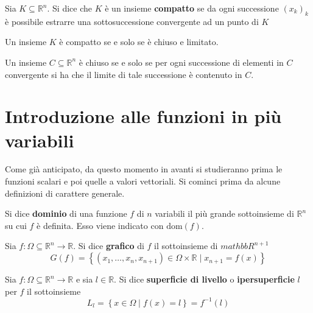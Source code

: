 \begin{definition}
    Sia $K \subseteq \mathbb{R}^n$. Si dice che $K$ è un insieme \textbf{compatto} se da ogni successione $(x_k)_k$ è possibile estrarre una sottosuccessione convergente ad un punto di $K$
\end{definition}
\begin{theorem} \label{Teo: Heine Borel}
    Un insieme $K$ è compatto se e solo se è chiuso e limitato.
    \begin{oss}
        Un insieme $C \subseteq \mathbb{R}^n$ è chiuso se e solo se per ogni successione di elementi in $C$ convergente si ha che il limite di tale successione è contenuto in $C$.
    \end{oss}
\end{theorem}


\section{Introduzione alle funzioni in più variabili}
Come già anticipato, da questo momento in avanti si studieranno prima le funzioni scalari e poi quelle a valori vettoriali.
Si cominci prima da alcune definizioni di carattere generale. 
\begin{definition}
    Si dice \textbf{dominio} di una funzione $f$ di $n$ variabili il più grande sottoinsieme di $\mathbb{R}^n$ su cui $f$ è definita. Esso viene indicato con $\text{dom}(f)$.
\end{definition}
\begin{definition}
    Sia $f: \Omega \subseteq \mathbb{R}^n \to \mathbb{R}$. Si dice \textbf{grafico} di $f$ il sottoinsieme di $mathbb{R}^{n+1}$
    \begin{equation}
        G(f)= \left\{(x_1, \dots, x_n, x_{n+1}) \in \Omega \times \mathbb{R} \mid x_{n+1}=f(x)\right\}
    \end{equation}
\end{definition}
\begin{definition}
    Sia $f:\Omega \subseteq \mathbb{R}^n \to \mathbb{R}$ e sia $l \in \mathbb{R}$. Si dice \textbf{superficie di livello} o \textbf{ipersuperficie} $l$ per $f$ il sottoinsieme
    \begin{equation}
        L_l=\left\{x \in \Omega \mid f(x)=l\right\}=f^{-1}(l)
    \end{equation}
\end{definition}

